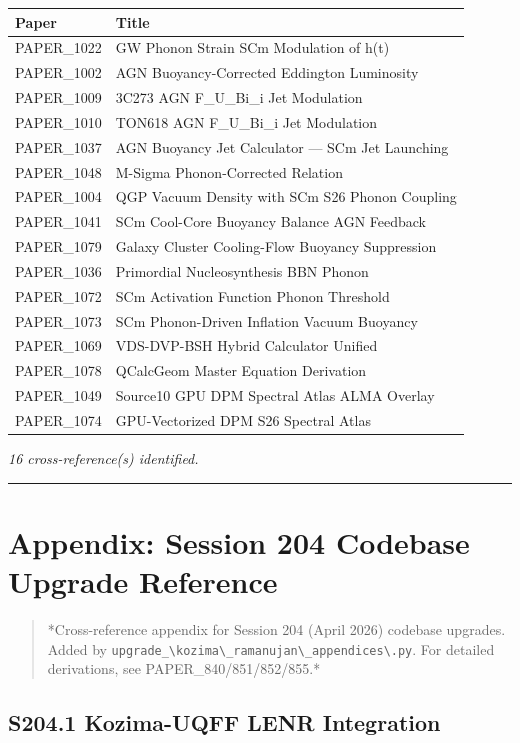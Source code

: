 \documentclass[12pt,a4paper]{article}
\begin{document}
\begin{table}[H]
\centering
\small
\begin{tabularx}{\linewidth}{@{}>{\raggedright\arraybackslash}X>{\raggedright\arraybackslash}X@{}}
\toprule
Paper & Title \tabularnewline
\midrule
PAPER\_1022 & GW Phonon Strain SCm Modulation of h(t) \tabularnewline
PAPER\_1002 & AGN Buoyancy-Corrected Eddington Luminosity \tabularnewline
PAPER\_1009 & 3C273 AGN F\_{U\_Bi\_i} Jet Modulation \tabularnewline
PAPER\_1010 & TON618 AGN F\_{U\_Bi\_i} Jet Modulation \tabularnewline
PAPER\_1037 & AGN Buoyancy Jet Calculator --- SCm Jet Launching \tabularnewline
PAPER\_1048 & M-Sigma Phonon-Corrected Relation \tabularnewline
PAPER\_1004 & QGP Vacuum Density with SCm S26 Phonon Coupling \tabularnewline
PAPER\_1041 & SCm Cool-Core Buoyancy Balance AGN Feedback \tabularnewline
PAPER\_1079 & Galaxy Cluster Cooling-Flow Buoyancy Suppression \tabularnewline
PAPER\_1036 & Primordial Nucleosynthesis BBN Phonon \tabularnewline
PAPER\_1072 & SCm Activation Function Phonon Threshold \tabularnewline
PAPER\_1073 & SCm Phonon-Driven Inflation Vacuum Buoyancy \tabularnewline
PAPER\_1069 & VDS-DVP-BSH Hybrid Calculator Unified \tabularnewline
PAPER\_1078 & QCalcGeom Master Equation Derivation \tabularnewline
PAPER\_1049 & Source10 GPU DPM Spectral Atlas ALMA Overlay \tabularnewline
PAPER\_1074 & GPU-Vectorized DPM S26 Spectral Atlas \tabularnewline
\bottomrule
\end{tabularx}
\end{table}

\emph{16 cross-reference(s) identified.}

\medskip\hrule\medskip

\section{Appendix: Session 204 Codebase Upgrade Reference}

\begin{quote}
*Cross-reference appendix for Session 204 (April 2026) codebase upgrades.
Added by \texttt{upgrade\_\textbackslash {kozima\textbackslash \_ramanujan\textbackslash \_appendices\textbackslash }.py}. For detailed derivations,
see PAPER\_840/851/852/855.*
\end{quote}

\subsection{S204.1 Kozima-UQFF LENR Integration}
\end{document}
